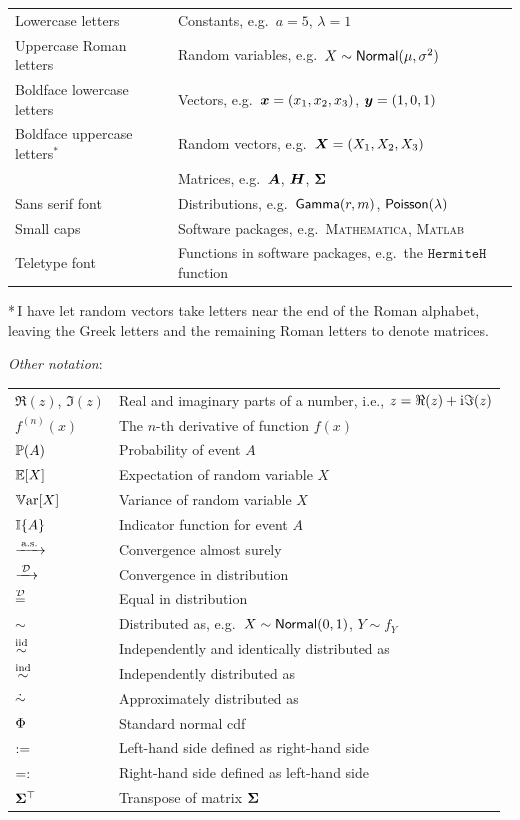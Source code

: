 \begin{tabular}{ll}
Lowercase letters & Constants, e.g.\ $a = 5$, $\lambda = 1$ \\
Uppercase Roman letters & Random variables, e.g.\ $X \sim \mathsf{Normal}(\mu, \sigma^2)$ \\
Boldface lowercase letters & Vectors, e.g.\ $\bm{x} = (x_1, x_2, x_3)$, $\bm{y} = (1, 0, 1)$ \\
Boldface uppercase letters${}^*$ & Random vectors, e.g.\ $\bm{X} = (X_1, X_2, X_3)$ \\
                           & Matrices, e.g.\ $\bm{A}$, $\bm{H}$, $\bm{\Sigma}$ \\
Sans serif font & Distributions, e.g.\ $\mathsf{Gamma}(r,m)$, $\mathsf{Poisson}(\lambda)$ \\
Small caps & Software packages, e.g.\ \textsc{Mathematica}, \textsc{Matlab} \\
Teletype font & Functions in software packages, e.g.\ the $\texttt{HermiteH}$ function \\
\end{tabular}

*\,I have let random vectors take letters near the end of the Roman alphabet, leaving the Greek letters and the remaining Roman letters to denote matrices.


\emph{Other notation}:

\begin{tabular}{ll}
$\Re(z)$, $\Im(z)$ & Real and imaginary parts of a number, i.e., $z = \Re(z) + \mathrm{i} \Im(z)$ \\
$f^{(n)}(x)$ & The $n$-th derivative of function $f(x)$ \\
$\operatorname{{\mathbb P}}(A)$ & Probability of event $A$ \\
$\operatorname{{\mathbb E}}[X]$ & Expectation of random variable $X$ \\
$\operatorname{\mathbb{V}\mathrm{ar}}[X]$ & Variance of random variable $X$ \\
$\mathbb{I}\{ A \}$ & Indicator function for event $A$ \\
$\xrightarrow{\:\smash{\mathrm{a.s.}}\:}$ & Convergence almost surely \\
$\xrightarrow{\:\smash{\mathcal{D}}\:}$ &  Convergence in distribution \\
$\stackrel{\smash{\mathcal{D}}}{=}$ & Equal in distribution \\
$\sim$ & Distributed as, e.g.\ $X \sim \mathsf{Normal}(0,1)$, $Y \sim f_Y$ \\
$\overset{\smash{\mathrm{iid}}}{\sim}$ & Independently and identically distributed as \\
$\overset{\smash{\mathrm{ind}}}{\sim}$ & Independently distributed as \\
$\mathrel{\dot\sim}$ & Approximately distributed as \\
$\mathrm{\Phi}$ & Standard normal cdf \\
$:=$ & Left-hand side defined as right-hand side \\
$=:$ & Right-hand side defined as left-hand side \\
$\bm{\Sigma}^{\top}$ & Transpose of matrix $\bm{\Sigma}$
\end{tabular}


